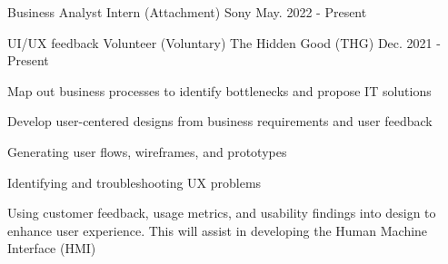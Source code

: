 

\begin{cventries}

  \cventry
    {Business Analyst Intern (Attachment)} %
    {Sony} %
    {May. 2022 - Present} %
    {} %
    {
      \begin{cvitems} %
        \item {}
      \end{cvitems}
    }

  \cventry
    {UI/UX feedback Volunteer (Voluntary)} %
    {The Hidden Good (THG)} %
    {Dec. 2021 - Present} %
    {} %
    {
      \begin{cvitems} %
        \item {Map out business processes to identify bottlenecks and propose IT solutions}
        \item {Develop user-centered designs from business requirements and user feedback}
        \item {Generating user flows, wireframes, and prototypes}
        \item {Identifying and troubleshooting UX problems}
        \item{Using customer feedback, usage metrics, and usability findings into design to enhance user experience. This will assist in developing the Human Machine Interface (HMI)}
      \end{cvitems}
    }
    

\end{cventries}
